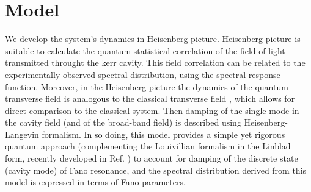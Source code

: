 \documentclass[12pt]{article}
\begin{document}
\section{Model}
We develop the system's dynamics in Heisenberg picture. Heisenberg picture is 
suitable to calculate the quantum statistical correlation of the field of light 
transmitted throught the kerr cavity. This field correlation can be related to 
the experimentally observed spectral distribution, using the spectral response 
function. \cite{scully1999quantum} Moreover, in the Heisenberg picture the 
dynamics of the quantum transverse field is analogous to the classical 
transverse field \cite{tannoudji1992atom}, which allows for direct comparison 
to the classical system. \cite{pan2019elucidating} Then damping of the 
single-mode in the cavity field (and of the broad-band field) is described 
using Heisenberg-Langevin formalism. In so doing, this model provides a simple 
yet rigorous quantum approach (complementing the Louivillian formalism in the
Linblad form, recently developed in Ref. \cite{finkelstein2015fano, 
finkelstein2016nonlinear}) to account for damping of the discrete state 
(cavity mode) of Fano resonance, and the spectral distribution derived from 
this model is expressed in terms of Fano-parameters. \cite{fano1961effects}
\end{document}
